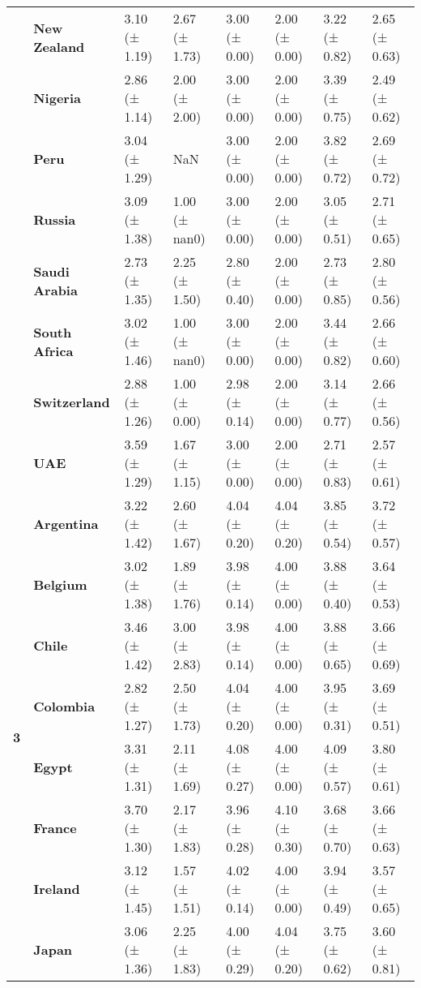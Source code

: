 \begin{tabular}{llllllll}
\textbf{} & \textbf{New Zealand} & 3.10 (± 1.19) & 2.67 (± 1.73) & 3.00 (± 0.00) & 2.00 (± 0.00) & 3.22 (± 0.82) & 2.65 (± 0.63) \\
\textbf{} & \textbf{Nigeria} & 2.86 (± 1.14) & 2.00 (± 2.00) & 3.00 (± 0.00) & 2.00 (± 0.00) & 3.39 (± 0.75) & 2.49 (± 0.62) \\
\textbf{} & \textbf{Peru} & 3.04 (± 1.29) & NaN & 3.00 (± 0.00) & 2.00 (± 0.00) & 3.82 (± 0.72) & 2.69 (± 0.72) \\
\textbf{} & \textbf{Russia} & 3.09 (± 1.38) & 1.00 (± nan0) & 3.00 (± 0.00) & 2.00 (± 0.00) & 3.05 (± 0.51) & 2.71 (± 0.65) \\
\textbf{} & \textbf{Saudi Arabia} & 2.73 (± 1.35) & 2.25 (± 1.50) & 2.80 (± 0.40) & 2.00 (± 0.00) & 2.73 (± 0.85) & 2.80 (± 0.56) \\
\textbf{} & \textbf{South Africa} & 3.02 (± 1.46) & 1.00 (± nan0) & 3.00 (± 0.00) & 2.00 (± 0.00) & 3.44 (± 0.82) & 2.66 (± 0.60) \\
\textbf{} & \textbf{Switzerland} & 2.88 (± 1.26) & 1.00 (± 0.00) & 2.98 (± 0.14) & 2.00 (± 0.00) & 3.14 (± 0.77) & 2.66 (± 0.56) \\
\textbf{} & \textbf{UAE} & 3.59 (± 1.29) & 1.67 (± 1.15) & 3.00 (± 0.00) & 2.00 (± 0.00) & 2.71 (± 0.83) & 2.57 (± 0.61) \\
\cline{1-8}
\multirow[t]{19}{*}{\textbf{3}} & \textbf{Argentina} & 3.22 (± 1.42) & 2.60 (± 1.67) & 4.04 (± 0.20) & 4.04 (± 0.20) & 3.85 (± 0.54) & 3.72 (± 0.57) \\
\textbf{} & \textbf{Belgium} & 3.02 (± 1.38) & 1.89 (± 1.76) & 3.98 (± 0.14) & 4.00 (± 0.00) & 3.88 (± 0.40) & 3.64 (± 0.53) \\
\textbf{} & \textbf{Chile} & 3.46 (± 1.42) & 3.00 (± 2.83) & 3.98 (± 0.14) & 4.00 (± 0.00) & 3.88 (± 0.65) & 3.66 (± 0.69) \\
\textbf{} & \textbf{Colombia} & 2.82 (± 1.27) & 2.50 (± 1.73) & 4.04 (± 0.20) & 4.00 (± 0.00) & 3.95 (± 0.31) & 3.69 (± 0.51) \\
\textbf{} & \textbf{Egypt} & 3.31 (± 1.31) & 2.11 (± 1.69) & 4.08 (± 0.27) & 4.00 (± 0.00) & 4.09 (± 0.57) & 3.80 (± 0.61) \\
\textbf{} & \textbf{France} & 3.70 (± 1.30) & 2.17 (± 1.83) & 3.96 (± 0.28) & 4.10 (± 0.30) & 3.68 (± 0.70) & 3.66 (± 0.63) \\
\textbf{} & \textbf{Ireland} & 3.12 (± 1.45) & 1.57 (± 1.51) & 4.02 (± 0.14) & 4.00 (± 0.00) & 3.94 (± 0.49) & 3.57 (± 0.65) \\
\textbf{} & \textbf{Japan} & 3.06 (± 1.36) & 2.25 (± 1.83) & 4.00 (± 0.29) & 4.04 (± 0.20) & 3.75 (± 0.62) & 3.60 (± 0.81) \\

\end{tabular}
